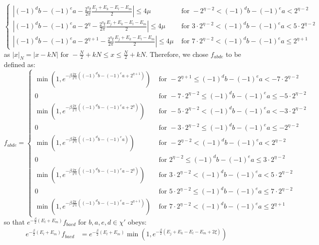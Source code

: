 \documentclass[aps,floatfix,10pt,amssymb,amsfont,amsmath,superscriptaddress,float,nofootinbib,longbibliography,nobalancelastpage,twocolumn]{revtex4-2}
\begin{document}
\begin{widetext}
\begin{equation}
\begin{cases}
     |(-1)^db-(-1)^ea-\frac{2^{\eta}t}{2\pi}\frac{E_j+E_k-E_l-E_m}{2}|\leq 4\mu&\text{ for }-2^{\eta-2}< (-1)^db-(-1)^ea < 2^{\eta-2}\\
     |(-1)^db-(-1)^ea-2^{\eta}-\frac{2^{\eta}t}{2\pi}\frac{E_j+E_k-E_l-E_m}{2}|\leq 4\mu&\text{ for }3\cdot 2^{\eta-2}< (-1)^db-(-1)^ea < 5\cdot 2^{\eta-2}\\
     |(-1)^db-(-1)^ea-2^{\eta+1}-\frac{2^{\eta}t}{2\pi}\frac{E_j+E_k-E_l-E_m}{2}|\leq 4\mu&\text{ for }7\cdot2^{\eta-2}< (-1)^db-(-1)^ea \leq 2^{\eta+1}
    \end{cases}
    \label{eq:conditions}
\end{equation}
as $|x|_N = |x - kN| \text{ for } -\frac{N}{2} + kN \leq x \leq \frac{N}{2} + kN$.
Therefore, we chose $f_{abde}$ to be defined as:
\begin{equation}
    f_{abde} = \begin{cases}
    \min(1,e^{-\beta\frac{2\pi}{2^{\eta}t}((-1)^db-(-1)^ea+2^{\eta+1})})&\text{ for }-2^{\eta+1}\leq (-1)^db-(-1)^ea < -7\cdot2^{\eta-2}\\
    0&\text{ for }-7\cdot2^{\eta-2}\leq (-1)^db-(-1)^ea \leq -5\cdot2^{\eta-2}\\
    \min(1,e^{-\beta\frac{2\pi}{2^{\eta}t}((-1)^db-(-1)^ea+2^{\eta})})&\text{ for }-5\cdot 2^{\eta-2}< (-1)^db-(-1)^ea < -3\cdot2^{\eta-2}\\
    0&\text{ for }-3\cdot2^{\eta-2}\leq (-1)^db-(-1)^ea \leq -2^{\eta-2}\\
     \min(1,e^{-\beta\frac{2\pi}{2^{\eta}t}((-1)^db-(-1)^ea)})&\text{ for }-2^{\eta-2}<(-1)^db-(-1)^ea < 2^{\eta-2}\\
    0&\text{ for }2^{\eta-2}\leq (-1)^db-(-1)^ea \leq 3\cdot2^{\eta-2}\\
     \min(1,e^{-\beta\frac{2\pi}{2^{\eta}t}((-1)^db-(-1)^ea-2^{\eta})})&\text{ for }3\cdot 2^{\eta-2}< (-1)^db-(-1)^ea < 5\cdot2^{\eta-2}\\
     0&\text{ for }5\cdot2^{\eta-2}\leq (-1)^db-(-1)^ea \leq 7\cdot2^{\eta-2}\\
     \min(1,e^{-\beta\frac{2\pi}{2^{\eta}t}((-1)^db-(-1)^ea-2^{\eta+1})})&\text{ for }7\cdot 2^{\eta-2}< (-1)^db-(-1)^ea \leq 2^{\eta+1}
    \end{cases}
\end{equation}
so that $e^{-\frac{\beta}{2}(E_l+E_m)}f_{baed}$ for $b, a, e, d \in \chi'$ obeys:
\begin{equation}
    \begin{aligned}
    e^{-\frac{\beta}{2}(E_l+E_m)}f_{baed} &= e^{-\frac{\beta}{2}(E_l+E_m)}\min(1,e^{-\frac{\beta}{2}(E_j+E_k-E_l-E_m + 2\xi)})\\

\end{aligned}
\end{equation}
\end{widetext}
\end{document}
